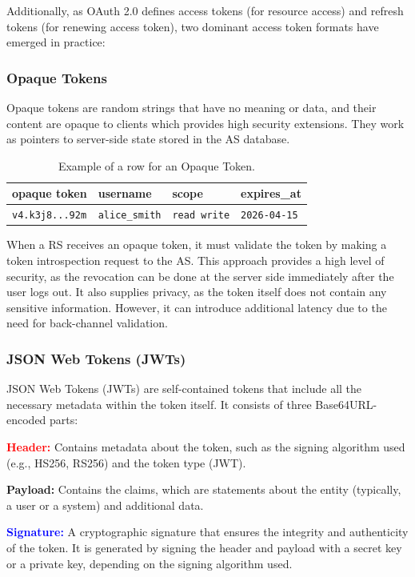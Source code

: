 \documentclass[../memoire.tex]{subfiles}
\begin{document}
Additionally, as OAuth 2.0 defines access tokens (for resource access) and refresh tokens (for renewing access token), two dominant access token formats have emerged in practice:

\subsubsection*{Opaque Tokens}

Opaque tokens  are random strings that have no meaning or data, and their content are opaque to clients which provides high security extensions\cite[p.~182]{richer2017}. They work as pointers to server-side state stored in the AS database\cite{rfc7662}. 

\begin{table}[htbp]
\centering
\small
\begin{tabularx}{0.9\textwidth}{ 
  | >{\raggedright\arraybackslash}X 
  | >{\raggedright\arraybackslash}X 
  | >{\raggedright\arraybackslash}X  
  | >{\raggedright\arraybackslash}X |
}
        \hline
        \textbf{opaque token} & \textbf{username} & \textbf{scope} & \textbf{expires\_at} \\ \hline
        \texttt{v4.k3j8...92m} & \texttt{alice\_smith} & \texttt{read write} & \texttt{2026-04-15}\\ \hline
\end{tabularx}
\caption{Example of a row for an Opaque Token.}
\label{tab:opaque_token_db}
\end{table}

When a RS receives an opaque token, it must validate the token by making a token introspection request to the AS. This approach provides a high level of security, as the revocation can be done at the server side immediately after the user logs out. It also supplies privacy, as the token itself does not contain any sensitive information. However, it can introduce additional latency due to the need for back-channel validation.

\subsubsection*{JSON Web Tokens (JWTs)}

JSON Web Tokens (JWTs) are self-contained tokens that include all the necessary metadata within the token itself\cite[p~.183]{richer2017}\cite{rfc7519}. It consists of three Base64URL-encoded parts: 

\begin{description}
  \item \textcolor{red}{\textbf{Header:}} Contains metadata about the token, such as the signing algorithm used (e.g., HS256, RS256) and the token type (JWT).
  \item \textbf{Payload:} Contains the claims, which are statements about the entity (typically, a user or a system) and additional data.  
  \item \textcolor{blue}{\textbf{Signature:}} A cryptographic signature that ensures the integrity and authenticity of the token. It is generated by signing the header and payload with a secret key or a private key, depending on the signing algorithm used.
\end{description}
\end{document}
